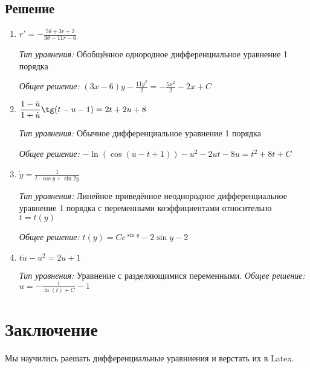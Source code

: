\documentclass[14pt, a4paper, titlepage, fleqn]{extarticle}
\begin{document}
        \subsection{Решение}
            \begin{enumerate}
                \item 
                \(
                    \displaystyle
                    r' = -\frac{5\theta + 3r + 2}{3\theta -11r-6}    
                \)

                \textit{Тип уравнения:}
                Обобщённое однородное дифференциальное уравнение 1 порядка

                \textit{Общее решение:}
                \(
                    \displaystyle
                    (3x-6)y-\frac{11y^2}{2}=-\frac{5x^2}{2}-2x+C
                \)

                \item 
                \(
                    \displaystyle
                    \frac{1-\dot{u}}{1+\dot{u}} \tg (t-u-1) = 2t+2u+8
                \)

                \textit{Тип уравнения:}
                Обычное дифференциальное уравнение 1 порядка

                \textit{Общее решение:}
                \(
                    \displaystyle
                    -\ln{(\cos{(u-t+1)})}-u^2-2ut-8u=t^2+8t+C
                \)

                \item 
                \(
                    \displaystyle
                    \dot{y} = \frac{1}{t \cdot \cos{y} + \sin{2y}}
                \)

                \textit{Тип уравнения:}
                Линейное приведённое неоднородное дифференциальное уравнение 
                1 порядка с переменными коэффициентами относительно \(t = t(y)\)

                \textit{Общее решение:}
                \(
                    \displaystyle
                    t(y) = C e^{\sin{y}} - 2 \sin{y}-2
                \)
                
                \item 
                \(
                    \displaystyle
                    t\dot{u} - u^2=2u+1    
                \)

                \textit{Тип уравнения:} Уравнение с разделяющимися переменными.
                \textit{Общее решение:}
                \(
                    \displaystyle
                    u = -\frac{1}{\ln(t) + C} - 1
                \)
            \end{enumerate}

    \pagebreak

    \section{Заключение}
        Мы научились раешать дифференциальные
        уравниения и верстать их в Latex.
\end{document}
